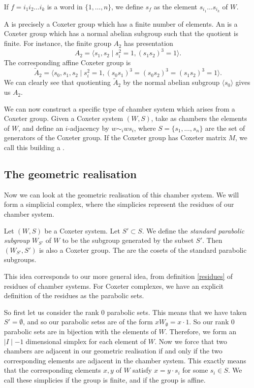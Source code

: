 \documentclass[11pt]{article}
\begin{document}
\begin{definition}
    If $f=i_1i_2\hdots  i_k$ is a word in $\{1,\hdots ,n\}$, we define $s_f$ as the element $s_{i_1}\hdots  s_{i_k}$ of $W$.
\end{definition}

A  is precisely a Coxeter group which has a finite number of elements. An  is a Coxeter group which has a normal abelian subgroup such that the quotient is finite. For instance, the finite group $A_2$ has presentation
\[A_2=\langle s_1,s_2\mid s_i^2=1, (s_1s_2)^3=1\rangle.\]
The corresponding affine Coxeter group is
\[\tilde{A}_2=\langle s_0,s_1,s_2\mid s_i^2=1, (s_0s_1)^3=(s_0s_2)^3=(s_1s_2)^3=1\rangle.\]
We can clearly see that quotienting $\tilde{A}_2$ by the normal abelian subgroup $\langle s_0\rangle$ gives us $A_2$. 


We can now construct a specific type of chamber system which arises from a Coxeter group. Given a Coxeter system $(W,S)$, take as chambers the elements of $W$, and define an $i$-adjacency by $w\sim_iws_i$, where $S=\{s_1,\hdots  ,s_n\}$ are the set of generators of the Coxeter group. If the Coxeter group has Coxeter matrix $M$, we call this building a .


\subsection{The geometric realisation}
Now we can look at the geometric realisation of this chamber system. We will form a simplicial complex, where the simplicies represent the residues of our chamber system. 



\begin{definition}
    Let $(W,S)$ be a Coxeter system. Let $S'\subset S$. We define the \textit{standard parabolic subgroup} $W_{S'}$ of $W$ to be the subgroup generated by the subset $S'$. Then $(W_{S'},S')$ is also a Coxeter group. The  are the cosets of the standard parabolic subgroups. 
\end{definition}

This idea corresponds to our more general idea, from definition \ref{residues} of residues of chamber systems. For Coxeter complexes, we have an explicit definition of the residues as the parabolic sets. 

So first let us consider the rank 0 parabolic sets. This means that we have taken $S'=\emptyset$, and so our parabolic setss are of the form $xW_\emptyset=x\cdot{1}$. So our rank 0 parabolic sets are in bijection with the elements of $W$. Therefore, we form an $\mid I\mid -1$ dimensional simplex for each element of $W$. Now we force that two chambers are adjacent in our geometric realisation if and only if the two corresponding elements are adjacent in the chamber system. This exactly means that the corresponding elements $x,y$ of $W$ satisfy $x=y\cdot s_i$ for some $s_i\in S$. We call these simplicies  if the group is finite, and  if the group is affine.
\end{document}
